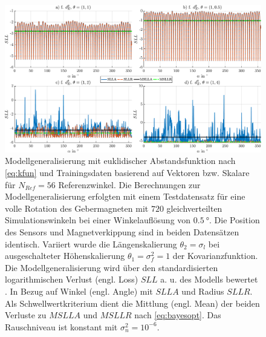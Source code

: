 \clearpage
\begin{landscape}
\begin{figure}[tbph]
\centering
\includegraphics[width=.8\linewidth]{chapters/images/4-EuOExp/Vergleich-QFCAPX-SLL}
\caption[Modellgeneralisierung mit euklidischer Abstandsfunktion]{Modellgeneralisierung mit euklidischer Abstandsfunktion nach \autoref{eq:kfun} und Trainingsdaten basierend auf Vektoren bzw. Skalare für $N_{Ref} = 56$ Referenzwinkel. Die Berechnungen zur Modellgeneralisierung erfolgten mit einem Testdatensatz für eine volle Rotation des Gebermagneten mit $720$ gleichverteilten Simulationswinkeln bei einer Winkelauflösung von $\SI{0,5}{\degree}$. Die Position des Sensors und Magnetverkippung sind in beiden Datensätzen identisch. Variiert wurde die Längenskalierung $\theta_2 = \sigma_l$ bei ausgeschalteter Höhenskalierung $\theta_1 = \sigma_f^2 = 1$ der Kovarianzfunktion. Die Modellgeneralisierung wird über den standardisierten logarithmischen Verlust (engl. Loss) $SLL$ a. u. des Modells bewertet \cite{Rasmussen2006}. In Bezug auf Winkel (engl. Angle) mit $SLLA$ und Radius $SLLR$. Als Schwellwertkriterium dient die Mittlung (engl. Mean) der beiden Verluste zu $MSLLA$ und $MSLLR$ nach \autoref{eq:bayesopt}. Das Rauschniveau ist konstant mit $\sigma_n^2 = 10^{-6}$.}
\label{fig:vergleich-qfcapx-sll}
\end{figure}
\end{landscape}
\clearpage


